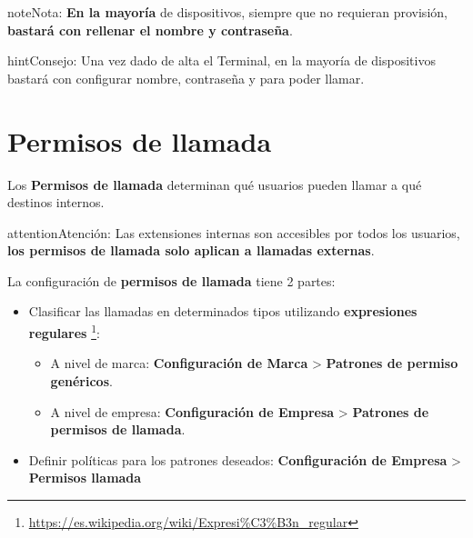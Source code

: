 \documentclass[letterpaper,10pt,spanish]{sphinxmanual}
\begin{document}
\begin{notice}{note}{Nota:}
\textbf{En la mayoría} de dispositivos, siempre que no requieran provisión, \textbf{bastará con rellenar el nombre y contraseña}.
\end{notice}

\begin{notice}{hint}{Consejo:}
Una vez dado de alta el Terminal, en la mayoría de dispositivos bastará con configurar nombre, contraseña y {\hyperref[internal_calls/brand_portal:domain\string-per\string-company]{}} para poder llamar.
\end{notice}


\section{Permisos de llamada}
\label{pbx_features/call_permissions:permisos-de-llamada}\label{pbx_features/call_permissions:call-permissions}\label{pbx_features/call_permissions::doc}
Los \textbf{Permisos de llamada} determinan qué usuarios pueden llamar a qué destinos internos.

\begin{notice}{attention}{Atención:}
Las extensiones internas son accesibles por todos los usuarios, \textbf{los permisos de llamada solo aplican a llamadas externas}.
\end{notice}

La configuración de \textbf{permisos de llamada} tiene 2 partes:
\begin{itemize}
\item {} 
Clasificar las llamadas en determinados tipos utilizando \textbf{expresiones regulares} \footnote[*]{\sphinxAtStartFootnote%
\url{https://es.wikipedia.org/wiki/Expresi\%C3\%B3n\_regular}
}:
\begin{itemize}
\item {} 
A nivel de marca: \textbf{Configuración de Marca} \textgreater{} \textbf{Patrones de permiso genéricos}.

\item {} 
A nivel de empresa: \textbf{Configuración de Empresa} \textgreater{} \textbf{Patrones de permisos de llamada}.

\end{itemize}

\item {} 
Definir políticas para los patrones deseados: \textbf{Configuración de Empresa} \textgreater{} \textbf{Permisos llamada}

\end{itemize}
\end{document}
